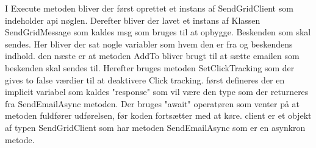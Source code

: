 I Execute metoden bliver der først oprettet et instans af SendGridClient som indeholder api nøglen.
Derefter bliver der lavet et instans af Klassen SendGridMessage som kaldes msg som bruges til at opbygge. 
Beskenden som skal sendes. Her bliver der sat nogle variabler som hvem den er fra og beskendens indhold. 
den næste er at metoden AddTo bliver brugt til at sætte emailen som beskenden skal sendes til. Herefter bruges metoden 
SetClickTracking som der gives to false værdier til at deaktivere Click tracking. først defineres der en implicit variabel 
som kaldes "response" som vil være den type som der returneres fra SendEmailAsync metoden. Der bruges "await" operatøren som venter
på at metoden fuldfører udførelsen, før koden fortsætter med at køre. client er et objekt af typen SendGridClient som har metoden
SendEmailAsync som er en asynkron metode.

